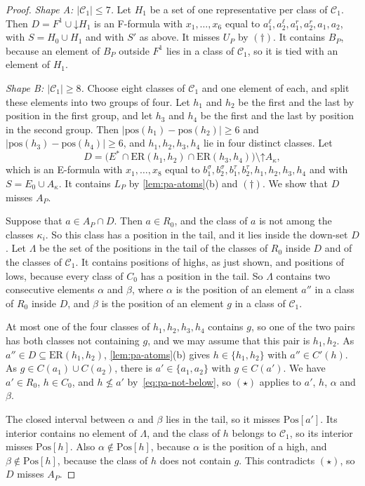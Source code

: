 \documentclass[pdflatex,sn-mathphys-num]{sn-jnl}%
\theoremstyle{thmstyleone}%
\theoremstyle{thmstyletwo}%
\theoremstyle{thmstylethree}%
\newcommand{\dn}{\mathord{\downarrow}}%
\newcommand{\upp}{\mathord{\uparrow}}%
\newcommand{\pos}{\mathrm{pos}}%
\newcommand{\Pos}{\mathrm{Pos}}%
\newcommand{\ER}{\mathrm{ER}}%
\begin{document}
\begin{proof}
\emph{Shape A: $|\mathcal{C}_1| \leq 7$.}
Let $H_1$ be a set of one representative per class of $\mathcal{C}_1$.
Then $D = F^1 \cup \dn H_1$ is an F-formula with $x_1, \dots, x_6$ equal to $a^\ell_1, a^\ell_2, a^r_1, a^r_2, a_1, a_2$, with $S = H_0 \cup H_1$ and with $S'$ as above.
It misses $U_P$ by $(\dagger)$.
It contains $B_P$, because an element of $B_P$ outside $F^1$ lies in a class of $\mathcal{C}_1$, so it is tied with an element of $H_1$.

\emph{Shape B: $|\mathcal{C}_1| \geq 8$.}
Choose eight classes of $\mathcal{C}_1$ and one element of each, and split these elements into two groups of four.
Let $h_1$ and $h_2$ be the first and the last by position in the first group, and let $h_3$ and $h_4$ be the first and the last by position in the second group.
Then $|\pos(h_1) - \pos(h_2)| \geq 6$ and $|\pos(h_3) - \pos(h_4)| \geq 6$, and $h_1, h_2, h_3, h_4$ lie in four distinct classes.
Let
\[
D = \bigl(E^* \cap \ER(h_1, h_2) \cap \ER(h_3, h_4)\bigr) \setminus \upp A_\kappa,
\]
which is an E-formula with $x_1, \dots, x_8$ equal to $b^\sigma_1, b^\sigma_2, b^\tau_1, b^\tau_2, h_1, h_2, h_3, h_4$ and with $S = E_0 \cup A_\kappa$.
It contains $L_P$ by \cref{lem:pa-atoms}(b) and $(\dagger)$.
We show that $D$ misses $A_P$.

Suppose that $a \in A_P \cap D$.
Then $a \in R_0$, and the class of $a$ is not among the classes $\kappa_i$.
So this class has a position in the tail, and it lies inside the down-set $D$.
Let $\Lambda$ be the set of the positions in the tail of the classes of $R_0$ inside $D$ and of the classes of $\mathcal{C}_1$.
It contains positions of highs, as just shown, and positions of lows, because every class of $C_0$ has a position in the tail.
So $\Lambda$ contains two consecutive elements $\alpha$ and $\beta$, where $\alpha$ is the position of an element $a''$ in a class of $R_0$ inside $D$, and $\beta$ is the position of an element $g$ in a class of $\mathcal{C}_1$.

At most one of the four classes of $h_1, h_2, h_3, h_4$ contains $g$, so one of the two pairs has both classes not containing $g$, and we may assume that this pair is $h_1, h_2$.
As $a'' \in D \subseteq \ER(h_1, h_2)$, \cref{lem:pa-atoms}(b) gives $h \in \{h_1, h_2\}$ with $a'' \in C'(h)$.
As $g \in C(a_1) \cup C(a_2)$, there is $a' \in \{a_1, a_2\}$ with $g \in C(a')$.
We have $a' \in R_0$, $h \in C_0$, and $h \not\leq a'$ by~\eqref{eq:pa-not-below}, so $(\star)$ applies to $a'$, $h$, $\alpha$ and $\beta$.

The closed interval between $\alpha$ and $\beta$ lies in the tail, so it misses $\Pos[a']$.
Its interior contains no element of $\Lambda$, and the class of $h$ belongs to $\mathcal{C}_1$, so its interior misses $\Pos[h]$.
Also $\alpha \notin \Pos[h]$, because $\alpha$ is the position of a high, and $\beta \notin \Pos[h]$, because the class of $h$ does not contain $g$.
This contradicts $(\star)$, so $D$ misses $A_P$.
\end{proof}
\end{document}
